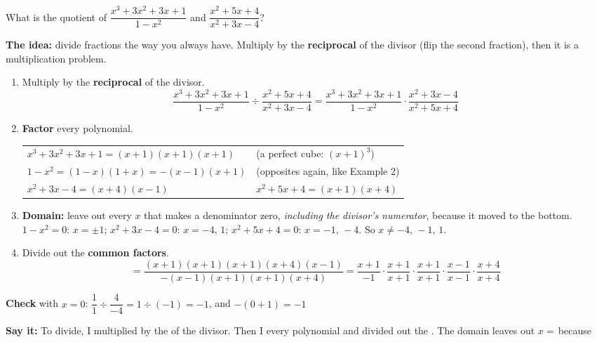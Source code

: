 \newpage
{}
What is the quotient of $\dfrac{x^3+3x^2+3x+1}{1-x^2}$ and $\dfrac{x^2+5x+4}{x^2+3x-4}$?

\textbf{The idea:} divide fractions the way you always have. Multiply by the \textbf{reciprocal} of the divisor (flip the second fraction), then it is a multiplication problem.

\begin{enumerate}[label=\textbf{\arabic*.}, itemsep=4pt]
\item Multiply by the \textbf{reciprocal} of the divisor.
\[\frac{x^3+3x^2+3x+1}{1-x^2}\div\frac{x^2+5x+4}{x^2+3x-4}=\frac{x^3+3x^2+3x+1}{1-x^2}\cdot\frac{x^2+3x-4}{x^2+5x+4}\]
\item \textbf{Factor} every polynomial.\\[2pt]
\begin{tabular}{@{}ll@{}}
$x^3+3x^2+3x+1=(x+1)(x+1)(x+1)$ & (a perfect cube: $(x+1)^3$)\\
$1-x^2=(1-x)(1+x)=-(x-1)(x+1)$ & (opposites again, like Example 2)\\
$x^2+3x-4=(x+4)(x-1)$ & $x^2+5x+4=(x+1)(x+4)$
\end{tabular}
\item \textbf{Domain:} leave out every $x$ that makes a denominator zero, \emph{including the divisor's numerator}, because it moved to the bottom.\\
$1-x^2=0$: $x=\pm1$; \quad $x^2+3x-4=0$: $x=-4,\,1$; \quad $x^2+5x+4=0$: $x=-1,\,-4$. \quad So $x\neq-4,\,-1,\,1$.
\item Divide out the \textbf{common factors}.
\[=\frac{(x+1)(x+1)(x+1)(x+4)(x-1)}{-(x-1)(x+1)(x+1)(x+4)}
=\frac{x+1}{-1}\cdot\frac{x+1}{x+1}\cdot\frac{x+1}{x+1}\cdot\frac{x-1}{x-1}\cdot\frac{x+4}{x+4}\]
\end{enumerate}

\begin{minipage}[t]{0.48\textwidth}
\vspace{0pt}
\end{minipage}\hfill
\begin{minipage}[t]{0.48\textwidth}
\vspace{0pt}
\textbf{Check} with $x=0$: $\dfrac{1}{1}\div\dfrac{4}{-4}=1\div(-1)=-1$, and $-(0+1)=-1$ \checkmark
\end{minipage}

\vspace{4pt}
\textbf{Say it:} To divide, I multiplied by the \blank[2.4cm] of the divisor. Then I \blank[2cm] every polynomial and divided out the \blank[3cm]. The domain leaves out $x=$\,\blank[2.6cm] because \lines[1]

